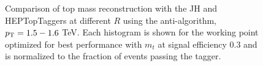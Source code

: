 \begin{figure}
\begin{center}
\caption{Comparison of top mass reconstruction with the JH and HEPTopTaggers at different $R$ using the anti-\kT algorithm, $p_{\rm T}=1.5-1.6$ TeV. Each histogram is shown for the working point optimized for best performance with $m_t$ at signal efficiency 0.3 and is normalized to the fraction of events passing the tagger.}
\label{fig:topmass_histogram_HEP_JH}
\end{center}
\end{figure}

